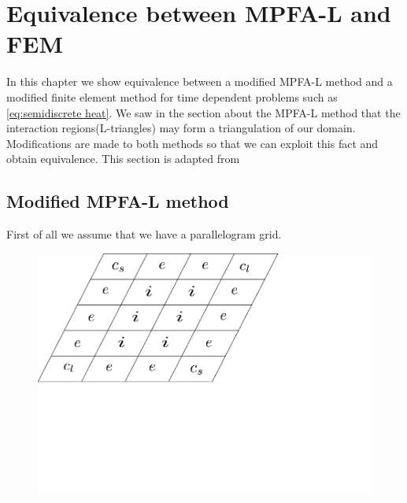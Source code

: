 \documentclass[../Main/main.tex]{subfiles}
\begin{document}
	\chapter{Equivalence between MPFA-L and FEM}
	\graphicspath{{../Equivalence between MPFA-L and FEM/figs/}}
	In this chapter we show equivalence between a modified MPFA-L method and a modified finite element method for time dependent problems such as  \eqref{eq:semidiscrete heat}. 
	We saw in the section about the MPFA-L method that the interaction regions(L-triangles) may form a triangulation of our domain.
	Modifications are made to both methods so that we can exploit this fact and obtain equivalence. This section is adapted from 
	\section*{Modified MPFA-L method}
	First of all we assume that we have a parallelogram grid.
	\begin{figure}[H]\label{fig:paralellogram mesh}
		\centering
		\includegraphics[width=1\textwidth]{paralellogram_mesh.pdf}
	\end{figure}
	
\end{document}
